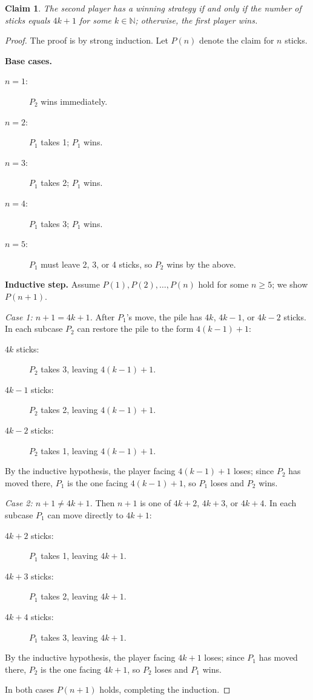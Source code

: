 \documentclass{article}
\newtheorem*{claim}{Claim}
\begin{document}
\begin{claim}
    The second player has a winning strategy if and only if the number of sticks
    equals $4k+1$ for some $k \in \mathbb{N}$; otherwise, the first player wins.
\end{claim}

\begin{proof}
    The proof is by strong induction. Let $P(n)$ denote the claim for $n$ sticks.

    \medskip
    \textbf{Base cases.}
    \begin{description}
        \item[$n=1$:] $P_2$ wins immediately.
        \item[$n=2$:] $P_1$ takes 1; $P_1$ wins.
        \item[$n=3$:] $P_1$ takes 2; $P_1$ wins.
        \item[$n=4$:] $P_1$ takes 3; $P_1$ wins.
        \item[$n=5$:] $P_1$ must leave 2, 3, or 4 sticks, so $P_2$ wins by the above.
    \end{description}

    \medskip
    \textbf{Inductive step.}
    Assume $P(1), P(2), \ldots, P(n)$ hold for some $n \geq 5$; we show $P(n+1)$.

    \medskip
    \textit{Case 1: $n+1 = 4k+1$.}
    After $P_1$'s move, the pile has $4k$, $4k-1$, or $4k-2$ sticks.
    In each subcase $P_2$ can restore the pile to the form $4(k-1)+1$:
    \begin{description}
        \item[$4k$ sticks:] $P_2$ takes 3, leaving $4(k-1)+1$.
        \item[$4k-1$ sticks:] $P_2$ takes 2, leaving $4(k-1)+1$.
        \item[$4k-2$ sticks:] $P_2$ takes 1, leaving $4(k-1)+1$.
    \end{description}
    By the inductive hypothesis, the player facing $4(k-1)+1$ loses; since $P_2$ has moved
    there, $P_1$ is the one facing $4(k-1)+1$, so $P_1$ loses and $P_2$ wins.

    \medskip
    \textit{Case 2: $n+1 \neq 4k+1$.}
    Then $n+1$ is one of $4k+2$, $4k+3$, or $4k+4$.
    In each subcase $P_1$ can move directly to $4k+1$:
    \begin{description}
        \item[$4k+2$ sticks:] $P_1$ takes 1, leaving $4k+1$.
        \item[$4k+3$ sticks:] $P_1$ takes 2, leaving $4k+1$.
        \item[$4k+4$ sticks:] $P_1$ takes 3, leaving $4k+1$.
    \end{description}
    By the inductive hypothesis, the player facing $4k+1$ loses; since $P_1$ has moved there,
    $P_2$ is the one facing $4k+1$, so $P_2$ loses and $P_1$ wins.

    \medskip
    In both cases $P(n+1)$ holds, completing the induction.
\end{proof}
\end{document}
